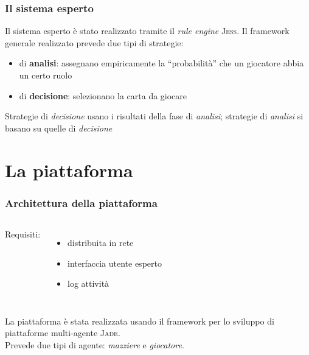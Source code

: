 \documentclass{beamer}
\newcommand*\lista{\item[$\diamondsuit$]}
\begin{document}


\begin{frame}
   \frametitle{Il sistema esperto}
   Il sistema esperto è stato realizzato tramite il \emph{rule engine} \textsc{Jess}.
   \vfill
   \pause
   Il framework generale realizzato prevede due tipi di strategie:
   \begin{itemize}
      \lista di \textbf{analisi}: assegnano empiricamente la ``probabilità'' che un giocatore abbia un certo ruolo
      \lista di \textbf{decisione}: selezionano la carta da giocare
   \end{itemize}
   \vfill
   \pause
   Strategie di \emph{decisione} usano i risultati della fase di \emph{analisi}; strategie di \emph{analisi} si basano su quelle di \emph{decisione}


\end{frame}


\section{La piattaforma}

\begin{frame}
   \frametitle{Architettura della piattaforma}
   \begin{columns}

   Requisiti:
   \begin{itemize}
      \lista distribuita in rete
      \lista interfaccia utente esperto
      \lista log attività
   \end{itemize}



   \begin{center}
   \begin{figure}      
   \end{figure}
   \end{center}

   \end{columns}
   
   \vfill
   \pause

   La piattaforma è stata realizzata usando il framework per lo sviluppo di piattaforme multi-agente \textsc{Jade}.\\
   Prevede due tipi di agente: \emph{mazziere} e \emph{giocatore}.
   \vfill

\end{frame}
\end{document}
